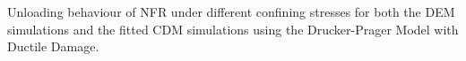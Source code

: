 \label{fig:fitted3} Unloading behaviour of NFR under different confining stresses for both the DEM simulations and the fitted CDM simulations using the Drucker-Prager Model with Ductile Damage.
